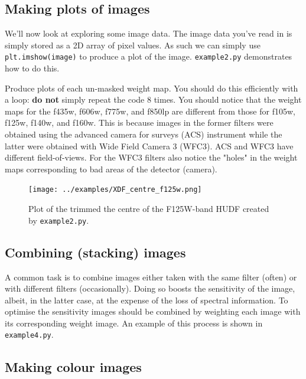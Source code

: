 \documentclass{article}
\begin{document}
\subsection{Making plots of images}

We'll now look at exploring some image data. The image data you've read in is simply stored as a 2D array of pixel values. As such we can simply use \texttt{plt.imshow(image)} to produce a plot of the image. \texttt{example2.py} demonstrates how to do this.

\begin{question}
Produce plots of each un-masked weight map. You should do this efficiently with a loop: \textbf{do not} simply repeat the code 8 times. You should notice that the weight maps for the f435w, f606w, f775w, and f850lp are different from those for f105w, f125w, f140w, and f160w. This is because images in the former filters were obtained using the advanced camera for surveys (ACS) instrument while the latter were obtained with Wide Field Camera 3 (WFC3). ACS and WFC3 have different field-of-views. For the WFC3 filters also notice the "holes" in the weight maps corresponding to bad areas of the detector (camera).
\end{question}


\begin{figure}\label{fig:centre_f125w}
	\centering
	\texttt{[image: ../examples/XDF\_centre\_f125w.png]}
	\caption{Plot of the trimmed the centre of the F125W-band HUDF created by \texttt{example2.py}.}
\end{figure}


\subsection{Combining (stacking) images}

A common task is to combine images either taken with the same filter (often) or with different filters (occasionally). Doing so boosts the sensitivity of the image, albeit, in the latter case, at the expense of the loss of spectral information. To optimise the sensitivity images should be combined by weighting each image with its corresponding weight image. An example of this process is shown in \texttt{example4.py}.


\subsection{Making colour images}
\end{document}
